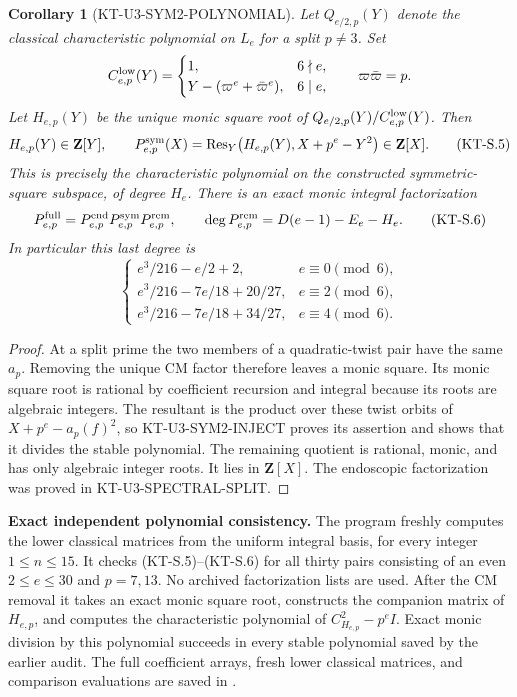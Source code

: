 \documentclass[11pt,a4paper]{article}
\newtheorem{corollary}[theorem]{Corollary}
\theoremstyle{definition}
\renewcommand{\paragraph}[1]{\par\smallskip\noindent\textbf{#1}\quad\ignorespaces}
\begin{document}
\begin{corollary}[KT-U3-SYM2-POLYNOMIAL]
Let $Q_{e/2,p}(Y)$ denote the classical characteristic polynomial
on $L_e$ for a split $p\ne3$.  Set
\[
 C^{\rm low}_{e,p}(Y)=
 \begin{cases}
 1,&6\nmid e,\\
 Y-(\varpi^e+\bar\varpi^e),&6\mid e,
 \end{cases}
 \qquad\varpi\bar\varpi=p.
\]
Let $H_{e,p}(Y)$ be the unique monic square root of
$Q_{e/2,p}(Y)/C^{\rm low}_{e,p}(Y)$.  Then
\[
 H_{e,p}(Y)\in\mathbf Z[Y],\qquad
 P^{\rm sym}_{e,p}(X)
   =\operatorname{Res}_{Y}
          \bigl(H_{e,p}(Y),X+p^e-Y^2\bigr)\in\mathbf Z[X].
                                                               \tag{KT-S.5}
\]
This is precisely the characteristic polynomial on the
constructed symmetric-square subspace, of degree $H_e$.
There is an exact monic integral factorization
\[
 P^{\rm full}_{e,p}
     =P^{\rm end}_{e,p}P^{\rm sym}_{e,p}P^{\rm rem}_{e,p},
 \qquad
 \deg P^{\rm rem}_{e,p}=D(e-1)-E_e-H_e.              \tag{KT-S.6}
\]
In particular this last degree is
\[
 \begin{cases}
 e^3/216-e/2+2,&e\equiv0\pmod6,\\
 e^3/216-7e/18+20/27,&e\equiv2\pmod6,\\
 e^3/216-7e/18+34/27,&e\equiv4\pmod6.
 \end{cases}
\]
\end{corollary}
\begin{proof}
At a split prime the two members of a quadratic-twist pair
have the same $a_p$.  Removing the unique CM factor therefore
leaves a monic square.  Its monic square root is rational by
coefficient recursion and integral because its roots are
algebraic integers.  The resultant is the product over these
twist orbits of $X+p^e-a_p(f)^2$, so KT-U3-SYM2-INJECT proves
its assertion and shows that it divides the stable polynomial.
The remaining quotient is rational, monic, and has only
algebraic integer roots.  It lies in $\mathbf Z[X]$.
The endoscopic factorization was proved in KT-U3-SPECTRAL-SPLIT.
\end{proof}

\paragraph{Exact independent polynomial consistency.}
The program  freshly computes
the lower classical matrices from the uniform integral basis,
for every integer $1\leq n\leq15$.  It checks (KT-S.5)--(KT-S.6)
for all thirty pairs consisting of an even $2\leq e\leq30$
and $p=7,13$.  No archived factorization lists are used.
After the CM removal it takes an exact monic square root,
constructs the companion matrix of $H_{e,p}$, and computes
the characteristic polynomial of $C_{H_{e,p}}^2-p^eI$.
Exact monic division by this polynomial succeeds in every
stable polynomial saved by the earlier audit.  The full
coefficient arrays, fresh lower classical matrices, and
comparison evaluations are saved in
.
\end{document}
